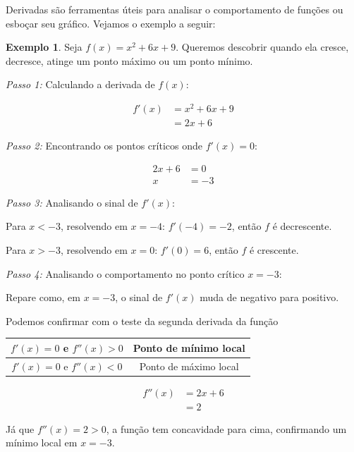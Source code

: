 \documentclass[12pt,openright,twoside,a4paper]{article}
\theoremstyle{definition}
\newtheorem{example}{Exemplo}[section]
\begin{document}
	Derivadas são ferramentas úteis para analisar o comportamento de funções ou esboçar seu gráfico. Vejamos o exemplo a seguir:
		
		\begin{example}
			Seja $f(x) = x^2 + 6x + 9$. Queremos descobrir quando ela cresce, decresce, atinge um ponto máximo ou um ponto mínimo.
			
			\textit{Passo 1:} Calculando a derivada de $f(x)$:
			
			\begin{align*}
				f'(x) &= x^2 + 6x + 9 \\
				&= 2x + 6
			\end{align*}
			
			\textit{Passo 2:} Encontrando os pontos críticos onde $f'(x) = 0$:
			
			\begin{align*}
				2x + 6 &= 0 \\
				x &= -3
			\end{align*}
			
			\textit{Passo 3:} Analisando o sinal de $f'(x)$:
			
			Para $x < -3$, resolvendo em $x = -4$: $f'(-4) = -2$, então $f$ é decrescente.
			
			Para $x > -3$, resolvendo em $x = 0$: $f'(0) = 6$, então $f$ é crescente.
			
			\textit{Passo 4:} Analisando o comportamento no ponto crítico $x = -3$:
			
			Repare como, em $x = -3$, o sinal de $f'(x)$ muda de negativo para positivo.
			
			Podemos confirmar com o teste da segunda derivada da função
			
			\begin{table}[h]
				\centering
				\begin{tabular}[t]{|c|c|}
					\hline
					$f'(x) = 0$ e $f''(x) > 0$ & Ponto de mínimo local\\
					\hline
					$f'(x) = 0$ e $f''(x) < 0$ & Ponto de máximo local\\
					\hline
				\end{tabular}
			\end{table}
			
			\begin{align*}
				f''(x) &= 2x + 6 \\
				&= 2
			\end{align*}
			
			Já que $f''(x) = 2 > 0$, a função tem concavidade para cima, confirmando um mínimo local em $x = -3$.
			

\end{example}
\end{document}
